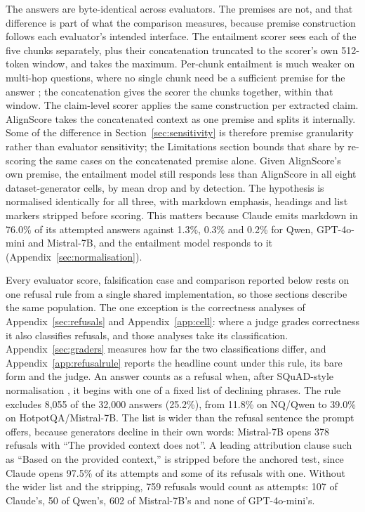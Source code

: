 \documentclass[11pt]{article}
\newcommand{\movedref}{Appendix}            %
\newcommand{\movedref}{Section}
\begin{document}
The answers are byte-identical across evaluators. The premises are not, and that difference is part of what the comparison measures, because premise construction follows each evaluator's intended interface. The entailment scorer sees each of the five chunks separately, plus their concatenation truncated to the scorer's own 512-token window, and takes the maximum. Per-chunk entailment is much weaker on multi-hop questions, where no single chunk need be a sufficient premise for the answer \citep{kumar-2026}; the concatenation gives the scorer the chunks together, within that window. The claim-level scorer applies the same construction per extracted claim. AlignScore takes the concatenated context as one premise and splits it internally. Some of the difference in Section~\ref{sec:sensitivity} is therefore premise granularity rather than evaluator sensitivity; the Limitations section bounds that share by re-scoring the same cases on the concatenated premise alone. Given AlignScore's own premise, the entailment model still responds less than AlignScore in all eight dataset-generator cells, by mean drop and by detection. The hypothesis is normalised identically for all three, with markdown emphasis, headings and list markers stripped before scoring. This matters because Claude emits markdown in 76.0\% of its attempted answers against 1.3\%, 0.3\% and 0.2\% for Qwen, GPT-4o-mini and Mistral-7B, and the entailment model responds to it (\movedref~\ref{sec:normalisation}).

Every evaluator score, falsification case and comparison reported below rests on one refusal rule from a single shared implementation, so those sections describe the same population. The one exception is the correctness analyses of \movedref~\ref{sec:refusals} and Appendix~\ref{app:cell}: where a judge grades correctness it also classifies refusals, and those analyses take its classification. \movedref~\ref{sec:graders} measures how far the two classifications differ, and Appendix~\ref{app:refusalrule} reports the headline count under this rule, its bare form and the judge. An answer counts as a refusal when, after SQuAD-style normalisation \citep{rajpurkar-etal-2016-squad}, it begins with one of a fixed list of declining phrases. The rule excludes 8,055 of the 32,000 answers (25.2\%), from 11.8\% on NQ/Qwen to 39.0\% on HotpotQA/Mistral-7B. The list is wider than the refusal sentence the prompt offers, because generators decline in their own words: Mistral-7B opens 378 refusals with ``The provided context does not''. A leading attribution clause such as ``Based on the provided context,'' is stripped before the anchored test, since Claude opens 97.5\% of its attempts and some of its refusals with one. Without the wider list and the stripping, 759 refusals would count as attempts: 107 of Claude's, 50 of Qwen's, 602 of Mistral-7B's and none of GPT-4o-mini's.
\end{document}
